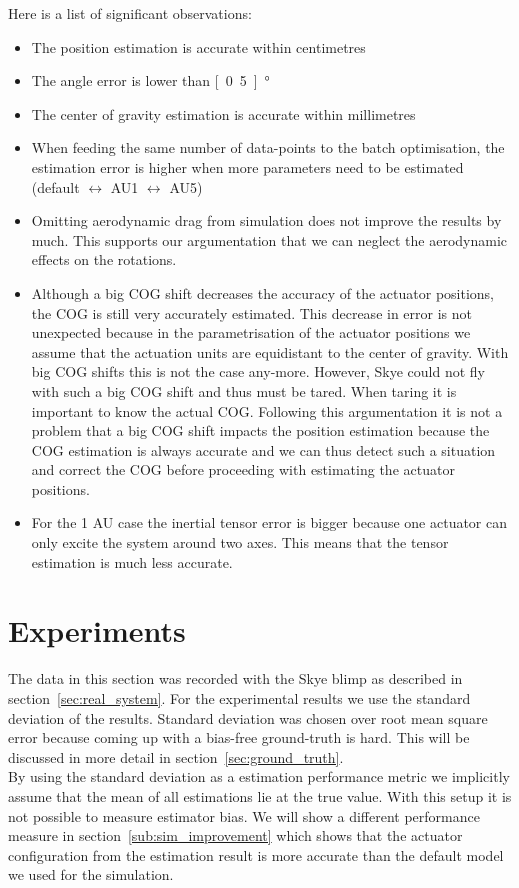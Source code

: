 Here is a list of significant observations:
\begin{itemize}
\item The position estimation is accurate within centimetres
\item The angle error is lower than \unit[0.5]{°}
\item The center of gravity estimation is accurate within millimetres
\item When feeding the same number of data-points to the batch optimisation, the estimation error is higher when more parameters need to be estimated (default $\leftrightarrow$ AU1 $\leftrightarrow$ AU5)
\item Omitting aerodynamic drag from simulation does not improve the results by much. This supports our argumentation that we can neglect the aerodynamic effects on the rotations.
\item Although a big COG shift decreases the accuracy of the actuator positions, the COG is still very accurately estimated. This decrease in error is not unexpected because in the parametrisation of the actuator positions we assume that the actuation units are equidistant to the center of gravity. With big COG shifts this is not the case any-more. However, Skye could not fly with such a big COG shift and thus must be tared. When taring it is important to know the actual COG. Following this argumentation it is not a problem that a big COG shift impacts the position estimation because the COG estimation is always accurate and we can thus detect such a situation and correct the COG before proceeding with estimating the actuator positions.
\item For the 1 AU case the inertial tensor error is bigger because one actuator can only excite the system around two axes. This means that the tensor estimation is much less accurate.
\end{itemize}


\section{Experiments}
The data in this section was recorded with the Skye blimp as described in section~\ref{sec:real_system}.
For the experimental results we use the standard deviation of the results.
Standard deviation was chosen over root mean square error because coming up with a bias-free ground-truth is hard.
This will be discussed in more detail in section~\ref{sec:ground_truth}. \\
By using the standard deviation as a estimation performance metric we implicitly assume that the mean of all estimations lie at the true value.
With this setup it is not possible to measure estimator bias.
We will show a different performance measure in section~\ref{sub:sim_improvement} which shows that the actuator configuration from the estimation result is more accurate than the default model we used for the simulation.

